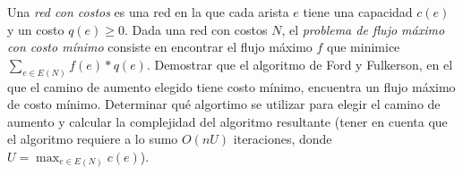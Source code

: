 
\item Una \emph{red con costos} es una red en la que cada arista $e$ tiene una capacidad $c(e)$ y un costo $q(e) \geq 0$.  Dada una red con costos $N$, el \emph{problema de flujo máximo con costo mínimo} consiste en encontrar el flujo máximo $f$ que minimice $\sum_{e \in E(N)} f(e) * q(e)$.  Demostrar que el algoritmo de Ford y Fulkerson, en el que el camino de aumento elegido tiene costo mínimo, encuentra un flujo máximo de costo mínimo.  Determinar qué algortimo se utilizar para elegir el camino de aumento y calcular la complejidad del algoritmo resultante (tener en cuenta que el algoritmo requiere a lo sumo $O(nU)$ iteraciones, donde $U=\max_{e\in E(N)}c(e)$). \label{ej:fmcm}


